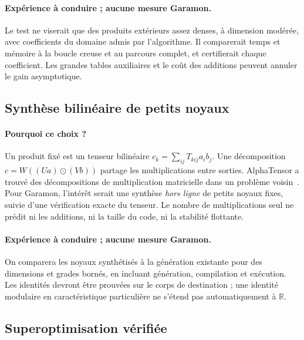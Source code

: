 \documentclass[11pt,a4paper]{article}
\begin{document}
\paragraph{Expérience à conduire ; aucune mesure Garamon.}
Le test ne viserait que des produits extérieurs assez denses, à dimension
modérée, avec coefficients du domaine admis par l'algorithme. Il comparerait
temps et mémoire à la boucle creuse et au parcours complet, et certifierait
chaque coefficient. Les grandes tables auxiliaires et le coût des additions
peuvent annuler le gain asymptotique.

\subsection{Synthèse bilinéaire de petits noyaux}
\paragraph{Pourquoi ce choix ?}
Un produit fixé est un tenseur bilinéaire
$c_k=\sum_{ij}T_{kij}a_i b_j$. Une décomposition
$c=W((Ua)\odot(Vb))$ partage les multiplications entre sorties.
AlphaTensor a trouvé des décompositions de multiplication matricielle dans
un problème voisin~\cite{alphatensor}. Pour Garamon, l'intérêt serait une
synthèse \emph{hors ligne} de petits noyaux fixes, suivie d'une vérification
exacte du tenseur. Le nombre de multiplications seul ne prédit ni les
additions, ni la taille du code, ni la stabilité flottante.

\paragraph{Expérience à conduire ; aucune mesure Garamon.}
On comparera les noyaux synthétisés à la génération existante pour des
dimensions et grades bornés, en incluant génération, compilation et
exécution. Les identités devront être prouvées sur le corps de destination ;
une identité modulaire en caractéristique particulière ne s'étend pas
automatiquement à $\mathbb R$.

\subsection{Superoptimisation vérifiée}
\end{document}
